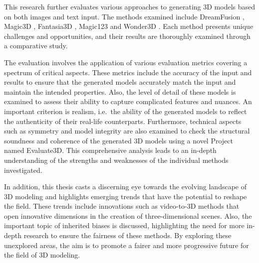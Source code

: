 This research further evaluates various approaches to generating 3D models based on both images and text input. The methods examined include DreamFusion \citep{pooleDreamfusion}, Magic3D \citep{lin2023magic3d}, Fantasia3D \citep{chen2023fantasia3d}, Magic123 \citep{qian2023magic123} and Wonder3D \citep{long2023wonder3d}. Each method presents unique challenges and opportunities, and their results are thoroughly examined through a comparative study. 

The evaluation involves the application of various evaluation metrics covering a spectrum of critical aspects. These metrics include the accuracy of the input and results to ensure that the generated models accurately match the input and maintain the intended properties. Also, the level of detail of these models is examined to assess their ability to capture complicated features and nuances. An important criterion is realism, i.e.~the ability of the generated models to reflect the authenticity of their real-life counterparts. Furthermore, technical aspects such as symmetry and model integrity are also examined to check the structural soundness and coherence of the generated 3D models using a novel Project named Evaluate3D. This comprehensive analysis leads to an in-depth understanding of the strengths and weaknesses of the individual methods investigated.

In addition, this thesis casts a discerning eye towards the evolving landscape of 3D modeling and highlights emerging trends that have the potential to reshape the field. These trends include innovations such as video-to-3D methods that open innovative dimensions in the creation of three-dimensional scenes. Also, the important topic of inherited biases is discussed, highlighting the need for more in-depth research to ensure the fairness of these methods. By exploring these unexplored areas, the aim is to promote a fairer and more progressive future for the field of 3D modeling.